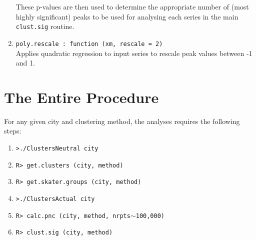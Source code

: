 \documentclass[a4paper,oneside]{article}
\begin{document}
\begin{enumerate}
        These p-values are then used to determine the appropriate number of (most highly significant) peaks to be used for analysing each series
        in the main {\tt clust.sig} routine.
    \item {\tt poly.rescale : function (xm, rescale = 2)}\\
        Applies quadratic regression to input series to rescale peak values between -1 and 1.
\end{enumerate}


\section{The Entire Procedure}

For any given city and clustering method, the analyses requires the following steps:
\begin{enumerate}
    \item {\tt >./ClustersNeutral city}
    \item {\tt R> get.clusters (city, method)}
    \item {\tt R> get.skater.groups (city, method)}
    \item {\tt >./ClustersActual city}
    \item {\tt R> calc.pnc (city, method, nrpts$\sim$100,000)}
    \item {\tt R> clust.sig (city, method)}
\end{enumerate}
\end{document}
